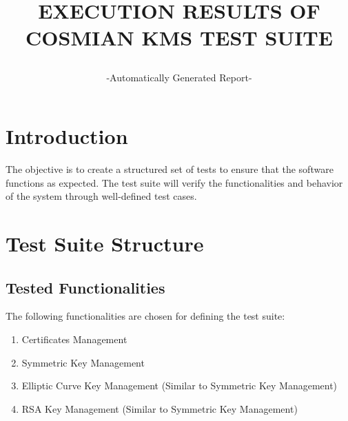 \documentclass[a4paper,12pt]{article}
\title{
    \textbf{\Huge EXECUTION RESULTS OF COSMIAN KMS TEST SUITE} \\
    \author{-Automatically Generated Report-}
    \date{}
    \vspace{1cm} %
}
\begin{document}
\maketitle
\thispagestyle{empty}
\newpage

\setcounter{page}{1}  %
\tableofcontents
\newpage

\section{Introduction}
The objective is to create a structured set of tests to ensure that the software functions as expected. The test suite will verify the functionalities and behavior of the system through well-defined test cases.

\section{Test Suite Structure}

\subsection{Tested Functionalities}
The following functionalities are chosen for defining the test suite:
\begin{enumerate}
    \item Certificates Management
    \item Symmetric Key Management
    \item Elliptic Curve Key Management (Similar to Symmetric Key Management)
    \item RSA Key Management (Similar to Symmetric Key Management)
\end{enumerate}
\end{document}
